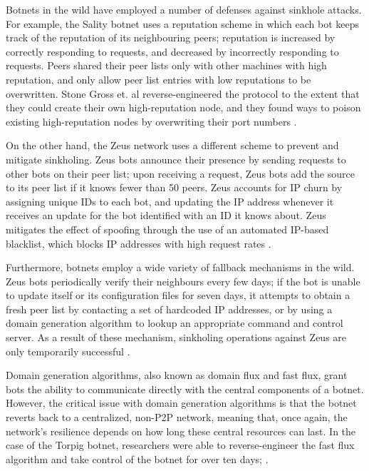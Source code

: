 \documentclass{acm_proc_article-sp}
\begin{document}
Botnets in the wild have employed a number of defenses against sinkhole attacks.  For example, the Sality botnet uses a reputation scheme in which each bot keeps track of the reputation of its neighbouring peers; reputation is increased by correctly responding to requests, and decreased by incorrectly responding to requests. Peers shared their peer lists only with other machines with high reputation, and only allow peer list entries with low reputations to be overwritten. Stone Gross et. al reverse-engineered the protocol to the extent that they could create their own high-reputation node, and they found ways to poison existing high-reputation nodes by overwriting their port numbers \cite{stone:p2p}.

On the other hand, the Zeus network uses a different scheme to prevent and mitigate sinkholing. Zeus bots announce their presence by sending requests to other bots on their peer list; upon receiving a request, Zeus bots add the source to its peer list if it knows fewer than 50 peers.  Zeus accounts for IP churn by assigning unique IDs to each bot, and updating the IP address whenever it receives an update for the bot identified with an ID it knows about.  Zeus mitigates the effect of spoofing through the use of an automated IP-based blacklist, which blocks IP addresses with high request rates \cite{stone:p2p}.

Furthermore, botnets employ a wide variety of fallback mechanisms in the wild.  Zeus bots periodically verify their neighbours every few days; if the bot is unable to update itself or its configuration files for seven days, it attempts to obtain a fresh peer list by contacting a set of hardcoded IP addresses, or by using a domain generation algorithm to lookup an appropriate command and control server.  As a result of these mechanism, sinkholing operations against Zeus are only temporarily successful \cite{stone:p2p}.

Domain generation algorithms, also known as domain flux and fast flux, grant bots the ability to communicate directly with the central components of a botnet.  However, the critical issue with domain generation algorithms is that the botnet reverts back to a centralized, non-P2P network, meaning that, once again, the network’s resilience depends on how long these central resources can last.  In the case of the Torpig botnet, researchers were able to reverse-engineer the fast flux algorithm and take control of the botnet for over ten days; \cite{stone:takeover}.
\end{document}
